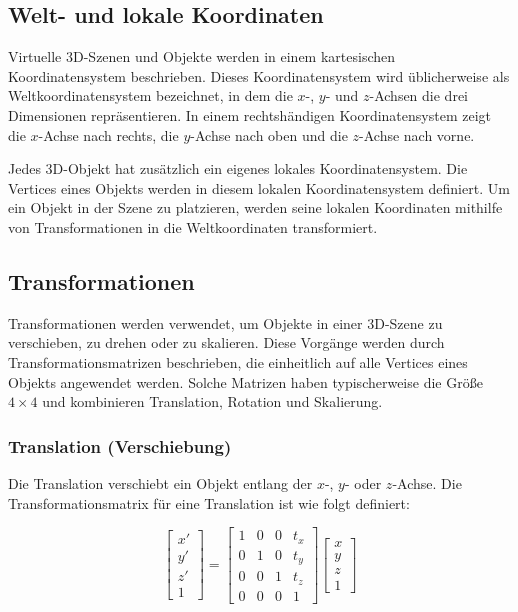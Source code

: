 \subsection{Welt- und lokale Koordinaten}

Virtuelle 3D-Szenen und Objekte werden in einem kartesischen Koordinatensystem beschrieben. Dieses Koordinatensystem wird üblicherweise als Weltkoordinatensystem bezeichnet, in dem die \(x\)-, \(y\)- und \(z\)-Achsen die drei Dimensionen repräsentieren. In einem rechtshändigen Koordinatensystem zeigt die \(x\)-Achse nach rechts, die \(y\)-Achse nach oben und die \(z\)-Achse nach vorne.

Jedes 3D-Objekt hat zusätzlich ein eigenes lokales Koordinatensystem. Die Vertices eines Objekts werden in diesem lokalen Koordinatensystem definiert. Um ein Objekt in der Szene zu platzieren, werden seine lokalen Koordinaten mithilfe von Transformationen in die Weltkoordinaten transformiert.

\subsection{Transformationen}

Transformationen werden verwendet, um Objekte in einer 3D-Szene zu verschieben, zu drehen oder zu skalieren. Diese Vorgänge werden durch Transformationsmatrizen beschrieben, die einheitlich auf alle Vertices eines Objekts angewendet werden. Solche Matrizen haben typischerweise die Größe \(4 \times 4\) und kombinieren Translation, Rotation und Skalierung.

\subsubsection{Translation (Verschiebung)}

Die Translation verschiebt ein Objekt entlang der \(x\)-, \(y\)- oder \(z\)-Achse. Die Transformationsmatrix für eine Translation ist wie folgt definiert:

\begin{equation}
\begin{bmatrix}
x' \\ y' \\ z' \\ 1
\end{bmatrix}
=
\begin{bmatrix}
1 & 0 & 0 & t_x \\
0 & 1 & 0 & t_y \\
0 & 0 & 1 & t_z \\
0 & 0 & 0 & 1
\end{bmatrix}
\begin{bmatrix}
x \\ y \\ z \\ 1
\end{bmatrix}
\end{equation}

